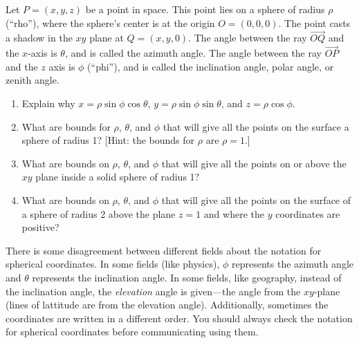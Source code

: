 \begin{problem}  \label{derive spherical coordinates}%
 Let
  $P=(x,y,z)$ be a point in space. This point lies on a sphere of
  radius $\rho$ (``rho''), where the sphere's center is at the origin
  $O=(0,0,0)$. The point casts a shadow in the $xy$ plane at
  $Q=(x,y,0)$.  The angle between the ray $\vec{OQ}$ and the $x$-axis
  is $\theta$, and is called the azimuth angle. The angle between
  the ray $\vec{OP}$ and the $z$ axis is $\phi$ (``phi''), and is
  called the inclination angle, polar angle, or zenith angle.

  \begin{enumerate}
  \item Explain why $x=\rho\sin\phi\cos\theta$, $y=\rho\sin\phi\sin\theta$, and $z=\rho\cos\phi$.
  \item What are bounds for $\rho$, $\theta$, and $\phi$ that will give all the points on the surface a sphere of radius 1? [Hint: the bounds for $\rho$ are $\rho=1$.]
  \item What are bounds on $\rho$, $\theta$, and $\phi$ that will give all the points on or above the $xy$ plane inside a solid sphere of radius 1?
  \item What are bounds on $\rho$, $\theta$, and $\phi$ that will give all the points on the surface of a sphere of radius 2 above the plane $z=1$ and where the $y$ coordinates are positive?
  \end{enumerate}
\end{problem}

%
There is some disagreement between different fields about the notation
for spherical coordinates.  In some fields (like physics), $\phi$
represents the azimuth angle and $\theta$ represents the inclination
angle.  In some fields, like geography, instead of the inclination angle, the
\emph{elevation} angle is given---the angle from the $xy$-plane (lines
of lattitude are from the elevation angle).
Additionally, sometimes the coordinates are written in a different
order.  You should always check the notation for spherical coordinates
before communicating using them.




